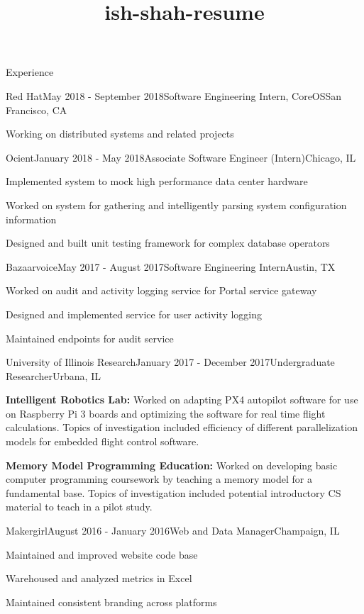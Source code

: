 \documentclass{resume} %
\title{ish-shah-resume}
\begin{document}
    
    \begin{rSection}{Experience}
    
    \begin{rSubsection}{Red Hat}{May 2018 - September 2018}{Software Engineering Intern, CoreOS}{San Francisco, CA}
    \item Working on distributed systems and related projects
    \end{rSubsection}
    
    \begin{rSubsection}{Ocient}{January 2018 - May 2018}{Associate Software Engineer (Intern)}{Chicago, IL}
    \item Implemented system to mock high performance data center hardware
    \item Worked on system for gathering and intelligently parsing system configuration information
    \item Designed and built unit testing framework for complex database operators    
    \end{rSubsection}
    
    \begin{rSubsection}{Bazaarvoice}{May 2017 - August 2017}{Software Engineering Intern}{Austin, TX}
    \item Worked on audit and activity logging service for Portal service gateway
    \item Designed and implemented service for user activity logging
    \item Maintained endpoints for audit service
    \end{rSubsection}
    
    \begin{rSubsection}{University of Illinois Research}{January 2017 - December 2017}{Undergraduate Researcher}{Urbana, IL}
    \item \textbf{Intelligent Robotics Lab:} Worked on adapting PX4 autopilot software for use on Raspberry Pi 3 boards and optimizing the software for real time flight calculations. Topics of investigation included efficiency of different parallelization models for embedded flight control software.
    \item \textbf{Memory Model Programming Education:} Worked on developing basic computer programming coursework by teaching a memory model for a fundamental base. Topics of investigation included potential introductory CS material to teach in a pilot study.
    \end{rSubsection}
    
    \begin{rSubsection}{Makergirl}{August 2016 - January 2016}{Web and Data Manager}{Champaign, IL}
    \item Maintained and improved website code base
    \item Warehoused and analyzed metrics in Excel
    \item Maintained consistent branding across platforms
    \end{rSubsection}
    
    \end{rSection}
    
\end{document}
